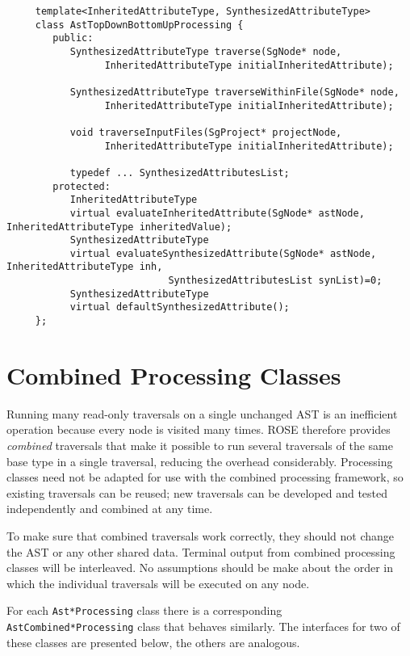 {\indent
{\footnotesize
\begin{verbatim}
     template<InheritedAttributeType, SynthesizedAttributeType>
     class AstTopDownBottomUpProcessing {
        public:
           SynthesizedAttributeType traverse(SgNode* node, 
                 InheritedAttributeType initialInheritedAttribute);

           SynthesizedAttributeType traverseWithinFile(SgNode* node, 
                 InheritedAttributeType initialInheritedAttribute);

           void traverseInputFiles(SgProject* projectNode, 
                 InheritedAttributeType initialInheritedAttribute);

           typedef ... SynthesizedAttributesList;
        protected:
           InheritedAttributeType
           virtual evaluateInheritedAttribute(SgNode* astNode, InheritedAttributeType inheritedValue);
           SynthesizedAttributeType
           virtual evaluateSynthesizedAttribute(SgNode* astNode, InheritedAttributeType inh, 
                            SynthesizedAttributesList synList)=0;
           SynthesizedAttributeType
           virtual defaultSynthesizedAttribute();
     };
\end{verbatim}
}
}

\section{Combined Processing Classes}

Running many read-only traversals on a single unchanged AST is an inefficient
operation because every node is visited many times. ROSE therefore provides
{\em combined} traversals that make it possible to run several traversals of
the same base type in a single traversal, reducing the overhead considerably.
Processing classes need not be adapted for use with the combined processing
framework, so existing traversals can be reused; new traversals can be
developed and tested independently and combined at any time.

To make sure that combined traversals work correctly, they should not change
the AST or any other shared data. Terminal output from combined processing
classes will be interleaved. No assumptions should be make about the order in
which the individual traversals will be executed on any node.

For each {\tt Ast*Processing} class there is a corresponding {\tt
AstCombined*Processing} class that behaves similarly. The interfaces for two
of these classes are presented below, the others are analogous.

